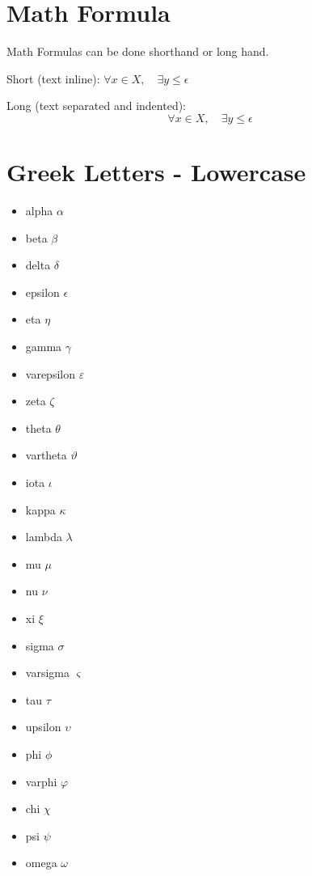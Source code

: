 \documentclass[11pt]{article}  %
\begin{document}
\section*{Math Formula}
Math Formulas can be done shorthand or long hand.

Short (text inline):
$\forall x \in X, \quad \exists y \leq \epsilon$

Long (text separated and indented):
\begin{displaymath}
\forall x \in X, \quad \exists y \leq \epsilon
\end{displaymath}

\section*{Greek Letters - Lowercase}
\begin{itemize}
\item alpha $\alpha$
\item beta $\beta$
\item delta $\delta$
\item epsilon $\epsilon$
\item eta $\eta$
\item gamma $\gamma$
\item varepsilon $\varepsilon$
\item zeta $\zeta$
\item theta $\theta$
\item vartheta $\vartheta$
\item iota $\iota$
\item kappa $\kappa$
\item lambda $\lambda$
\item mu $\mu$
\item nu $\nu$
\item xi $\xi$
\item sigma $\sigma$
\item varsigma $\varsigma$
\item tau $\tau$
\item upsilon $\upsilon$
\item phi $\phi$
\item varphi $\varphi$
\item chi $\chi$
\item psi $\psi$
\item omega $\omega$
\end{itemize}
\end{document}
